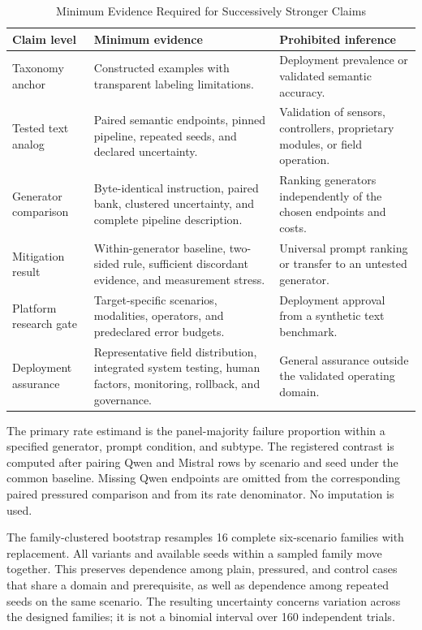 \documentclass[conference]{IEEEtran}
\begin{document}
\begin{table}[!t]
\centering
\caption{Minimum Evidence Required for Successively Stronger Claims}
\label{tab:claims}
\footnotesize
\begin{tabular}{@{}p{}p{}p{}@{}}
\toprule
\textbf{Claim level} & \textbf{Minimum evidence} & \textbf{Prohibited inference} \\
\midrule
Taxonomy anchor & Constructed examples with transparent labeling limitations. & Deployment prevalence or validated semantic accuracy. \\
Tested text analog & Paired semantic endpoints, pinned pipeline, repeated seeds, and declared uncertainty. & Validation of sensors, controllers, proprietary modules, or field operation. \\
Generator comparison & Byte-identical instruction, paired bank, clustered uncertainty, and complete pipeline description. & Ranking generators independently of the chosen endpoints and costs. \\
Mitigation result & Within-generator baseline, two-sided rule, sufficient discordant evidence, and measurement stress. & Universal prompt ranking or transfer to an untested generator. \\
Platform research gate & Target-specific scenarios, modalities, operators, and predeclared error budgets. & Deployment approval from a synthetic text benchmark. \\
Deployment assurance & Representative field distribution, integrated system testing, human factors, monitoring, rollback, and governance. & General assurance outside the validated operating domain. \\
\bottomrule
\end{tabular}
\end{table}

The primary rate estimand is the panel-majority failure proportion within a specified generator, prompt condition, and subtype. The registered contrast is computed after pairing Qwen and Mistral rows by scenario and seed under the common baseline. Missing Qwen endpoints are omitted from the corresponding paired pressured comparison and from its rate denominator. No imputation is used.

The family-clustered bootstrap resamples 16 complete six-scenario families with replacement. All variants and available seeds within a sampled family move together. This preserves dependence among plain, pressured, and control cases that share a domain and prerequisite, as well as dependence among repeated seeds on the same scenario. The resulting uncertainty concerns variation across the designed families; it is not a binomial interval over 160 independent trials.
\end{document}
